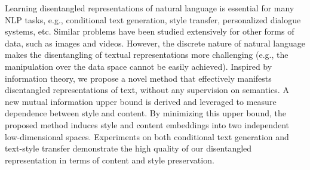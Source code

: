 Learning disentangled representations of natural language is essential for many NLP tasks, e.g., conditional text generation, style transfer, personalized dialogue systems, etc. Similar problems have been studied extensively for other forms of data, such as images and videos.  However, the discrete nature of natural language makes the disentangling of textual representations more challenging (e.g., the manipulation over the data space cannot be easily achieved). Inspired by information theory, we propose a novel method that effectively manifests disentangled representations of text, without any supervision on semantics. A new mutual information upper bound is derived and leveraged to measure dependence between style and content. By minimizing this upper bound, the proposed method induces style and content embeddings into two independent low-dimensional spaces. Experiments on both conditional text generation and text-style transfer demonstrate the high quality of our disentangled representation in terms of content and style preservation.
